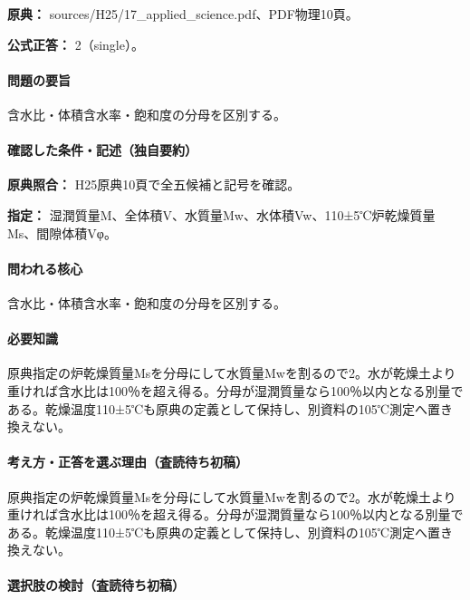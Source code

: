 \noindent\textbf{原典：} sources/H25/17\_applied\_science.pdf、PDF物理10頁。

\textbf{公式正答：} 2（single）。

\paragraph{問題の要旨} 含水比・体積含水率・飽和度の分母を区別する。

\paragraph{確認した条件・記述（独自要約）}\mbox{}\par

\noindent\textbf{原典照合：} H25原典10頁で全五候補と記号を確認。\par

\noindent\textbf{指定：} 湿潤質量M、全体積V、水質量Mw、水体積Vw、110±5℃炉乾燥質量Ms、間隙体積Vφ。\par

\paragraph{問われる核心} 含水比・体積含水率・飽和度の分母を区別する。

\paragraph{必要知識} 原典指定の炉乾燥質量Msを分母にして水質量Mwを割るので2。水が乾燥土より重ければ含水比は100％を超え得る。分母が湿潤質量なら100％以内となる別量である。乾燥温度110±5℃も原典の定義として保持し、別資料の105℃測定へ置き換えない。

\paragraph{考え方・正答を選ぶ理由（査読待ち初稿）} 原典指定の炉乾燥質量Msを分母にして水質量Mwを割るので2。水が乾燥土より重ければ含水比は100％を超え得る。分母が湿潤質量なら100％以内となる別量である。乾燥温度110±5℃も原典の定義として保持し、別資料の105℃測定へ置き換えない。

\paragraph{選択肢の検討（査読待ち初稿）}\mbox{}\par

